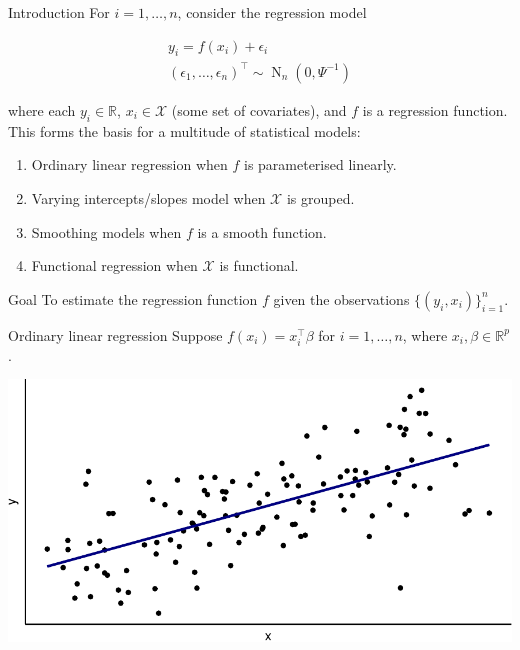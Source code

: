 \documentclass[,aspectratio=43]{beamer}
\DeclareMathOperator{\N}{N}
\newcommand{\bbR}{\mathbb{R}}
\newcommand{\cX}{{\mathcal X}}
\begin{document}
\begin{frame}{Introduction}
For \(i=1,\dots,n\), consider the regression model

\begin{equation}\label{mod1}
\begin{gathered}
y_i = f(x_i) + \epsilon_i \\
(\epsilon_1,\dots,\epsilon_n)^\top \sim \N_n(0, \Psi^{-1})
\end{gathered}
\end{equation}

where each \(y_i\in\bbR\), \(x_i\in \cX\) (some set of covariates), and
\(f\) is a regression function. This forms the basis for a multitude of
statistical models:

\begin{enumerate}
\item
  Ordinary linear regression when \(f\) is parameterised linearly.
\item
  Varying intercepts/slopes model when \(\cX\) is grouped.
\item
  Smoothing models when \(f\) is a smooth function.
\item
  Functional regression when \(\cX\) is functional.
\end{enumerate}

\begin{block}{Goal}
\protect\hypertarget{goal}{}
To estimate the regression function \(f\) given the observations
\(\{(y_i,x_i)\}_{i=1}^n\).
\end{block}
\end{frame}

\begin{frame}{Ordinary linear regression}
\protect\hypertarget{ordinary-linear-regression}{}
Suppose \(f(x_i) = x_i^\top \beta\) for \(i=1,\dots,n\), where
\(x_i,\beta \in \bbR^p\).

\vspace{1em}

\includegraphics{figure/linear-reg-1.pdf}
\end{frame}
\end{document}
